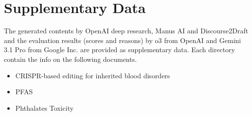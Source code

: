 \documentclass[utf8]{frontiers_suppmat} %
\begin{document}
\onecolumn
{}

\title[Discourse2Draft]{{}}


\maketitle


\section{Supplementary Data}

The generated contents by OpenAI deep research, Manus AI and Discourse2Draft and the evaluation results (scores and reasons) by o3 from OpenAI and Gemini 3.1 Pro from Google Inc. are provided as supplementary data. Each directory contain the info on the following documents.

\begin{itemize}
    \item CRISPR-based editing for inherited blood disorders
    \item PFAS
    \item Phthalates Toxicity
\end{itemize}
\end{document}
